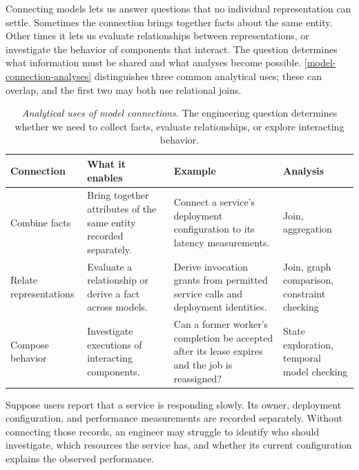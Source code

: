 Connecting models lets us answer questions that no individual representation can settle. Sometimes the connection brings together facts about the same entity. Other times it lets us evaluate relationships between representations, or investigate the behavior of components that interact. The question determines what information must be shared and what analyses become possible. \autoref{model-connection-analyses} distinguishes three common analytical uses; these can overlap, and the first two may both use relational joins.

{\footnotesize
\begin{longtable}[]{@{}
>{\raggedright\arraybackslash}p{}
>{\raggedright\arraybackslash}p{}
>{\raggedright\arraybackslash}p{}
>{\raggedright\arraybackslash}p{}@{}}
\caption[Analytical uses of model connections]{\emph{Analytical uses of model connections.} The engineering question determines whether we need to collect facts, evaluate relationships, or explore interacting behavior.}\label{model-connection-analyses}\\
\toprule
Connection & What it enables & Example & Analysis \\
\midrule
\endhead
\bottomrule
\endlastfoot
Combine facts & Bring together attributes of the same entity recorded separately. & Connect a service's deployment configuration to its latency measurements. & Join, aggregation \\
Relate representations & Evaluate a relationship or derive a fact across models. & Derive invocation grants from permitted service calls and deployment identities. & Join, graph comparison, constraint checking \\
Compose behavior & Investigate executions of interacting components. & Can a former worker's completion be accepted after its lease expires and the job is reassigned? & State exploration, temporal model checking \\
\end{longtable}
}

Suppose users report that a service is responding slowly. Its owner, deployment configuration, and performance measurements are recorded separately. Without connecting those records, an engineer may struggle to identify who should investigate, which resources the service has, and whether its current configuration explains the observed performance.


